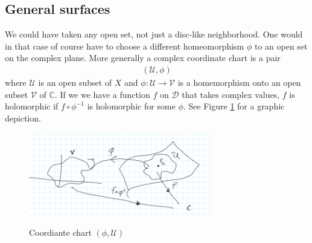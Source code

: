 \documentclass[lettersize,12pt]{article}
\begin{document}
\subsection{General surfaces}
We could have taken any open set, not just a disc-like neighborhood. One would in that case of course have to choose a different homeomorphism $\phi$ to an open set on the complex plane. More generally a complex coordinate chart is a pair
\begin{equation}
	\begin{aligned}
		(\mathcal{U},\phi)
	\end{aligned}
\end{equation}
where $\mathcal{U}$ is an open subset of $X$ and $\phi:\mathcal{U}\to \mathcal{V}$ is a homemorphism onto an open subset $\mathcal{V}$ of $\mathds{C}$. If we we have a function $f$ on $\mathcal{D}$ that takes complex values, $f$ is holomorphic if $f\circ \phi^{-1}$ is holomorphic for some $\phi$. See Figure \ref{fig:charts} for a graphic depiction.

\begin{figure}[H]\centering
\includegraphics[width=8cm]{4} \label{fig:charts} \caption{Coordiante chart $(\phi, \mathcal{U})$}
\end{figure}
\end{document}
